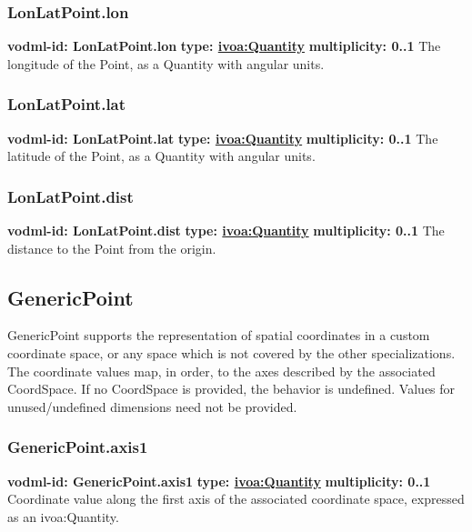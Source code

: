     \subsubsection{LonLatPoint.lon}
      \textbf{vodml-id: LonLatPoint.lon} \newline
      \textbf{type: \hyperref[sect:ivoa]{ivoa:Quantity}} \newline
      \textbf{multiplicity: 0..1} \newline 
      The longitude of the Point, as a Quantity with angular units.

    \subsubsection{LonLatPoint.lat}
      \textbf{vodml-id: LonLatPoint.lat} \newline
      \textbf{type: \hyperref[sect:ivoa]{ivoa:Quantity}} \newline
      \textbf{multiplicity: 0..1} \newline 
      The latitude of the Point, as a Quantity with angular units.

    \subsubsection{LonLatPoint.dist}
      \textbf{vodml-id: LonLatPoint.dist} \newline
      \textbf{type: \hyperref[sect:ivoa]{ivoa:Quantity}} \newline
      \textbf{multiplicity: 0..1} \newline 
      The distance to the Point from the origin.


  \subsection{GenericPoint}
  \label{sect:GenericPoint}
    GenericPoint supports the representation of spatial coordinates in a custom coordinate space, or any space which is not covered by the other specializations. The coordinate values map, in order, to the axes described by the associated CoordSpace. If no CoordSpace is provided, the behavior is undefined. Values for unused/undefined dimensions need not be provided.

    \subsubsection{GenericPoint.axis1}
      \textbf{vodml-id: GenericPoint.axis1} \newline
      \textbf{type: \hyperref[sect:ivoa]{ivoa:Quantity}} \newline
      \textbf{multiplicity: 0..1} \newline 
      Coordinate value along the first axis of the associated coordinate space, expressed as an ivoa:Quantity.


